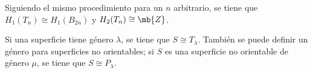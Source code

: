 Siguiendo el mismo procedimiento para un $n$ arbitrario, se tiene que $H_1(T_n) \cong H_1(B_{2n})$ y $H_2(T_n)\cong \mb{Z}$.

\begin{teo}
\end{teo}

Si una superficie tiene género $\lambda$, se tiene que $S \cong T_\lambda$. También se puede definir un género para superficies no orientables; si $S$ es una superficie no orientable de género $\mu$, se tiene que $S \cong P_\lambda$.